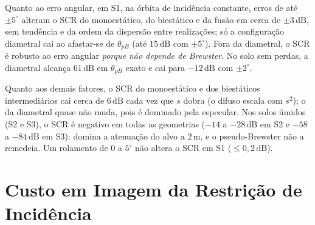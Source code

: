 \documentclass[12pt,a4paper,oneside]{book}
\theoremstyle{remark}
\newcommand{\dB}{\,\mathrm{dB}}
\theoremstyle{plain}
\theoremstyle{definition}
\begin{document}
Quanto ao erro angular, em S1, na órbita de incidência constante,
erros de até $\pm5^\circ$ alteram o SCR do monoestático, do biestático e da fusão em
cerca de $\pm3\dB$, sem tendência e da ordem da dispersão entre realizações; só a
configuração diametral cai ao afastar-se de $\theta_{pB}$ (até $15\dB$ com
$\pm5^\circ$). Fora da diametral, o SCR é robusto ao erro angular \emph{porque não
depende de Brewster}. No solo sem perdas, a diametral alcança $61\dB$ em
$\theta_{pB}$ exato e cai para $-12\dB$ com $\pm2^\circ$.

Quanto aos demais fatores, o SCR do monoestático e dos biestáticos
intermediários cai cerca de $6\dB$ cada vez que $s$ dobra (o difuso escala com
$s^2$); o da diametral quase não muda, pois é dominado pela especular. Nos solos
úmidos (S2 e S3), o SCR é negativo em todas as geometrias ($-14$ a $-28\dB$ em S2 e
$-58$ a $-84\dB$ em S3): domina a atenuação do alvo a $2\,$m, e o pseudo-Brewster
não a remedeia. Um rolamento de $0$ a $5^\circ$ não altera o SCR em S1
($\le0,2\dB$).

\section{Custo em Imagem da Restrição de Incidência}
\label{sec:sup_custo}

\begin{table}[H]
\centering\small
\caption{Hélice de referência ($53,4^\circ$) frente à órbita restrita ao
pseudo-Brewster, com janela de Hann. Em negrito, a trajetória que vence cada
métrica no canal; menor é melhor, exceto contraste e SCR.}
\label{tab:sup_custo}
\end{table}
\end{document}
